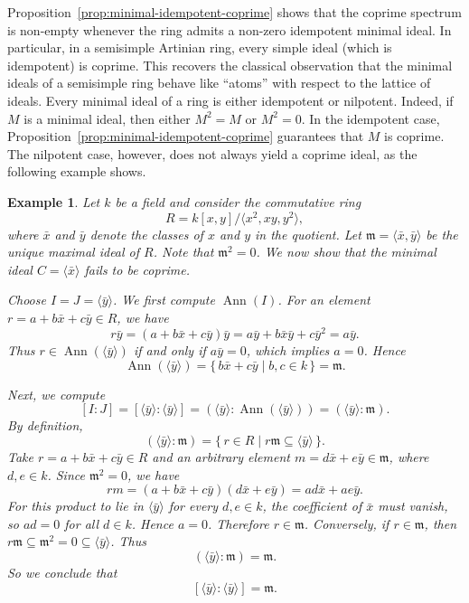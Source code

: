 \documentclass{amsart}
\newtheorem{example}{Example}
\DeclareMathOperator{\ann}{Ann}
\begin{document}
Proposition~\ref{prop:minimal-idempotent-coprime} shows that the coprime spectrum is non-empty whenever the ring admits a non-zero idempotent minimal ideal. In particular, in a semisimple Artinian ring, every simple ideal (which is idempotent) is coprime. This recovers the classical observation that the minimal ideals of a semisimple ring behave like ``atoms'' with respect to the lattice of ideals. Every minimal ideal of a ring is either idempotent or nilpotent. Indeed, if $M$ is a minimal ideal, then either $M^2=M$ or $M^2=0$. In the idempotent case, Proposition~\ref{prop:minimal-idempotent-coprime} guarantees that $M$ is coprime. The nilpotent case, however, does not always yield a coprime ideal, as the following example shows.

\begin{example}\label{ex:nilpotent-minimal-not-coprime}
Let $k$ be a field and consider the commutative ring
\[
R = k[x,y]/\langle x^2, xy, y^2\rangle,
\]
where $\bar{x}$ and $\bar{y}$ denote the classes of $x$ and $y$ in the quotient.  Let $\mathfrak{m} = \langle \bar{x}, \bar{y} \rangle $ be the unique maximal ideal of $R$. Note that $\mathfrak{m}^2 = 0$. We now show that the minimal ideal $C = \langle \bar{x} \rangle$ fails to be coprime.

Choose $I = J = \langle \bar{y} \rangle$. We first compute $\ann(I)$. For an element $r = a + b\bar{x} + c\bar{y} \in R$, we have
\[
r\bar{y} = (a + b\bar{x} + c\bar{y})\bar{y} = a\bar{y} + b\bar{x}\bar{y} + c\bar{y}^2 = a\bar{y}.
\]
Thus $r \in \ann(\langle \bar{y} \rangle)$ if and only if $a\bar{y} = 0$, which implies $a = 0$. Hence
\[
\ann(\langle \bar{y} \rangle) = \{\, b\bar{x} + c\bar{y} \mid b,c \in k \,\} = \mathfrak{m}.
\]

Next, we compute
\[
[I:J] = [\langle \bar{y} \rangle:\langle \bar{y} \rangle] = (\langle \bar{y} \rangle : \ann(\langle \bar{y} \rangle)) = (\langle \bar{y} \rangle : \mathfrak{m}).
\]
By definition,
\[
(\langle \bar{y} \rangle : \mathfrak{m}) = \{\, r \in R \mid r\mathfrak{m} \subseteq \langle \bar{y} \rangle \,\}.
\]
Take $r = a + b\bar{x} + c\bar{y} \in R$ and an arbitrary element $m = d\bar{x} + e\bar{y} \in \mathfrak{m}$, where $d,e \in k$. Since $\mathfrak{m}^2 = 0$, we have
\[
r m = (a + b\bar{x} + c\bar{y})(d\bar{x} + e\bar{y}) = ad\bar{x} + ae\bar{y}.
\]
For this product to lie in $\langle \bar{y} \rangle$ for every $d,e \in k$, the coefficient of $\bar{x}$ must vanish, so $ad = 0$ for all $d \in k$. Hence $a = 0$. Therefore $r \in \mathfrak{m}$. Conversely, if $r \in \mathfrak{m}$, then $r\mathfrak{m} \subseteq \mathfrak{m}^2 = 0 \subseteq \langle \bar{y} \rangle$. Thus
\[
(\langle \bar{y} \rangle : \mathfrak{m}) = \mathfrak{m}.
\]
So we conclude that
\[
[\langle \bar{y} \rangle:\langle \bar{y} \rangle] = \mathfrak{m}.
\]


\end{example}
\end{document}
